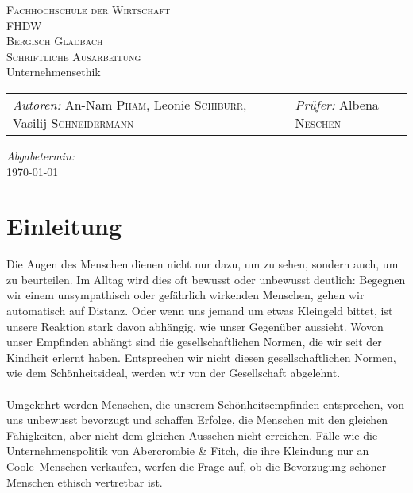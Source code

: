 \documentclass[a4paper, fontsize=12pt, parskip=full, toc=bibliographynumbered]{scrreprt}
\begin{document}
\newcommand{\headerrule}{\tabucline -}
\newcommand{\abbildung}[2]{\begin{figure}\centering
    \fbox{\texttt{[image: \#1]}}\caption{#2}
    \label{fig:#1}\end{figure}}

\author{}
\begin{titlepage}
  \begin{center}
    \textsc{\large Fachhochschule der Wirtschaft\\FHDW}\\[1em]
    \textsc{\large Bergisch Gladbach}\\[2em]
    \textsc{Schriftliche Ausarbeitung}\\[6em]
    {\LARGE Unternehmensethik}\\[25em]
    \begin{tabu} to 0.8\textwidth {X[l] X[r]}
      \emph{Autoren:}\linebreak
      An-Nam \textsc{Pham},\linebreak
      Leonie \textsc{Schiburr},\linebreak
      Vasilij \textsc{Schneidermann}
      &
      \emph{Prüfer:}\linebreak
      Albena \textsc{Neschen}
    \end{tabu}
    \vfill
    \emph{Abgabetermin:}\\
    \today
  \end{center}
\end{titlepage}

\tableofcontents
\listoffigures
\listoftables
\clearpage
{}
\setcounter{page}{1}

\chapter{Einleitung}

Die Augen des Menschen dienen nicht nur dazu, um zu sehen, sondern auch, um zu beurteilen. Im Alltag wird dies oft bewusst oder unbewusst deutlich:
Begegnen wir einem unsympathisch oder gefährlich wirkenden Menschen, gehen wir automatisch auf Distanz. Oder wenn uns jemand um etwas Kleingeld bittet, ist unsere Reaktion stark davon abhängig, wie unser Gegenüber aussieht. Wovon unser Empfinden abhängt sind die gesellschaftlichen Normen, die wir seit der Kindheit erlernt haben. Entsprechen wir nicht diesen gesellschaftlichen Normen, wie dem Schönheitsideal, werden wir von der Gesellschaft abgelehnt.\\
\\
Umgekehrt werden Menschen, die unserem Schönheitsempfinden entsprechen, von uns unbewusst bevorzugt und schaffen Erfolge, die Menschen mit den gleichen Fähigkeiten, aber nicht dem gleichen Aussehen nicht erreichen. Fälle wie die Unternehmenspolitik von Abercrombie \& Fitch, die ihre Kleindung nur an \glqq Coole\grqq~Menschen verkaufen, werfen die Frage auf, ob die Bevorzugung schöner Menschen ethisch vertretbar ist.
\end{document}
